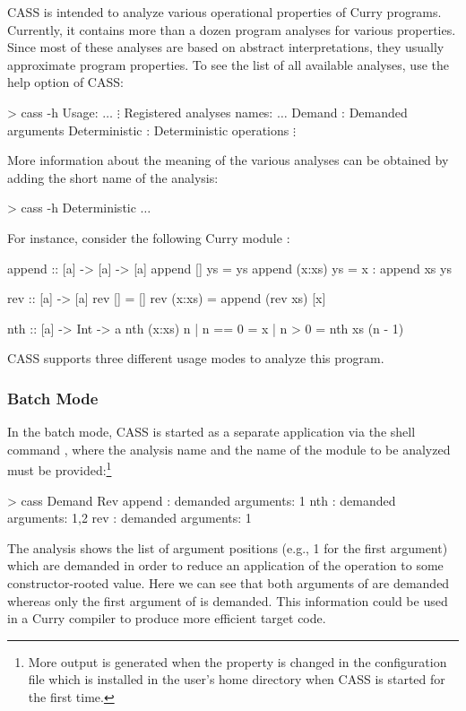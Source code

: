 CASS is intended to analyze various operational properties
of Curry programs. Currently, it contains more than a dozen
program analyses for various properties.
Since most of these analyses are based on abstract interpretations,
they usually approximate program properties.
To see the list of all available analyses, use the help option of CASS:
\begin{curry}
> cass -h
Usage: $\ldots$
$\vdots$
Registered analyses names:
$\ldots$
Demand          : Demanded arguments
Deterministic   : Deterministic operations
$\vdots$
\end{curry}
More information about the meaning of the various analyses
can be obtained by adding the short name of the analysis:
\begin{curry}
> cass -h Deterministic
$\ldots$
\end{curry}
For instance, consider the following Curry module :
\begin{curry}
append :: [a] -> [a] -> [a]
append []     ys = ys
append (x:xs) ys = x : append xs ys

rev :: [a] -> [a]
rev []     = []
rev (x:xs) = append (rev xs) [x]

nth :: [a] -> Int -> a
nth (x:xs) n | n == 0 = x
             | n > 0  = nth xs (n - 1)
\end{curry}
%
CASS supports three different usage modes to analyze this program.

\subsubsection{Batch Mode}

In the batch mode, CASS is started as a separate application
via the shell command ,
where the analysis name and the name of the module to be analyzed
must be provided:\footnote{More output is generated when
the property  is changed in the configuration file
 which is installed in the user's home directory
when CASS is started for the first time.}
\begin{curry}
> cass Demand Rev
append : demanded arguments: 1
nth : demanded arguments: 1,2
rev : demanded arguments: 1
\end{curry}
The  analysis shows the list of argument positions
(e.g., 1 for the first argument) which are demanded in order
to reduce an application of the operation to some constructor-rooted value.
Here we can see that both arguments of  are demanded
whereas only the first argument of  is demanded.
This information could be used in a Curry compiler
to produce more efficient target code.

